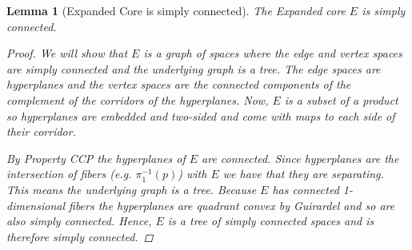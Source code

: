 \documentclass{article}
\theoremstyle{mystyle}
\newtheorem{lem}[thm]{Lemma}
\theoremstyle{remark}
\begin{document}
\begin{lem}
    [Expanded Core is simply connected]
    \label{lem:coresc} 
    The Expanded core $E$ is simply connected.
    
    \begin{proof}
    
        
    
        We will show that $E$ is a graph of spaces where the edge and vertex spaces are simply connected and the underlying graph is a tree. The edge spaces are hyperplanes and the vertex spaces are the connected components of the complement of the corridors of the hyperplanes. Now, $E$ is a subset of a product so hyperplanes are embedded and two-sided and come with maps to each side of their corridor. 
        
        By Property CCP the hyperplanes of $E$ are connected. Since hyperplanes are the intersection of fibers (e.g. $\pi_1^{-1}(p)$) with $E$ we have that they are separating. This means the underlying graph is a tree. Because $E$ has connected 1-dimensional fibers the hyperplanes are quadrant convex by Guirardel and so are also simply connected. Hence, $E$ is a tree of simply connected spaces and is therefore simply connected.
        
        



        

\end{proof}
\end{lem}
\end{document}
